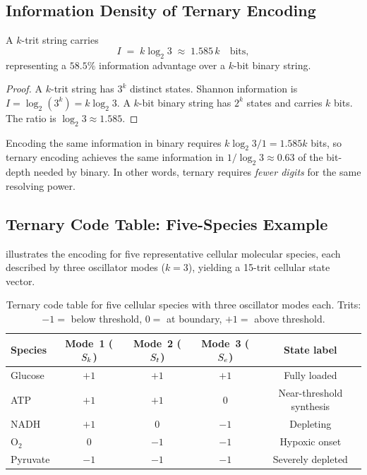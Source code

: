 \subsection{Information Density of Ternary Encoding}

\begin{proposition}
\label{prop:ch03-trit-info}
A $k$-trit string carries
\begin{equation}
    I \;=\; k\log_2 3 \;\approx\; 1.585\,k\quad\text{bits},
    \label{eq:ch03-trit-info}
\end{equation}
representing a $58.5\%$ information advantage over a $k$-bit binary string.
\end{proposition}

\begin{proof}
A $k$-trit string has $3^k$ distinct states.  Shannon information is
$I=\log_2(3^k)=k\log_2 3$.  A $k$-bit binary string has $2^k$ states and
carries $k$ bits.  The ratio is $\log_2 3\approx 1.585$.
\end{proof}

\begin{corollary}
Encoding the same information in binary requires $k\log_2 3/1=1.585k$ bits,
so ternary encoding achieves the same information in $1/\log_2 3\approx 0.63$
of the bit-depth needed by binary.  In other words, ternary requires
\emph{fewer digits} for the same resolving power.
\end{corollary}

\subsection{Ternary Code Table: Five-Species Example}

 illustrates the encoding for five representative
cellular molecular species, each described by three oscillator modes
($k=3$), yielding a 15-trit cellular state vector.

\begin{table}[htbp]
\centering
\caption{Ternary code table for five cellular species with three oscillator
         modes each.  Trits: $-1=$ below threshold, $0=$ at boundary,
         $+1=$ above threshold.}
\label{tab:ch03-ternary-table}
\begin{tabular}{lcccc}
\hline
Species & Mode~1 ($S_k$) & Mode~2 ($S_t$) & Mode~3 ($S_e$) & State label \\
\hline
Glucose    & $+1$ & $+1$ & $+1$ & Fully loaded \\
ATP        & $+1$ & $+1$ &  $0$ & Near-threshold synthesis \\
NADH       & $+1$ &  $0$ & $-1$ & Depleting \\
O$_2$      &  $0$ & $-1$ & $-1$ & Hypoxic onset \\
Pyruvate   & $-1$ & $-1$ & $-1$ & Severely depleted \\
\hline
\end{tabular}
\end{table}

